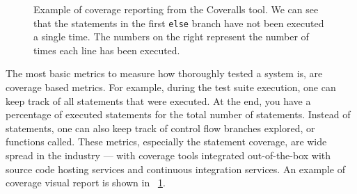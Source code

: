 \documentclass[a4paper,11pt]{sdm_internship}
\theoremstyle{definition}
\begin{document}
\begin{figure}
  \centering
  \cprotect\caption{Example of coverage reporting from the Coveralls\protect\footnotemark{} tool. We can see that the statements in the first \texttt{else} branch have not been executed a single time. The numbers on the right represent the number of times each line has been executed.}%
  \label{fig:screenshot_coverage}
\end{figure}

The most basic metrics to measure how thoroughly tested a system is, are coverage based metrics.
For example, during the test suite execution, one can keep track of all statements that were executed.
At the end, you have a percentage of executed statements for the total number of statements.
Instead of statements, one can also keep track of control flow branches explored, or functions called.
These metrics, especially the statement coverage, are wide spread in the industry --- with coverage tools integrated out-of-the-box with source code hosting services and continuous integration services.
An example of coverage visual report is shown in \figurename~\ref{fig:screenshot_coverage}.
\end{document}
